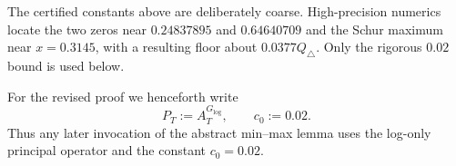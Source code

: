 \begin{remark}
The certified constants above are deliberately coarse.  High-precision
numerics locate the two zeros near $0.24837895$ and $0.64640709$ and the Schur
maximum near $x=0.3145$, with a resulting floor about
$0.0377Q_\triangle$.  Only the rigorous $0.02$ bound is used below.
\end{remark}

For the revised proof we henceforth write
\begin{equation}
\boxed{
P_T:=A_T^{G_{\log}},\qquad c_0:=0.02.
}
\label{eq:PT-logonly-definition}
\end{equation}
Thus any later invocation of the abstract min--max lemma uses the log-only
principal operator and the constant $c_0=0.02$.